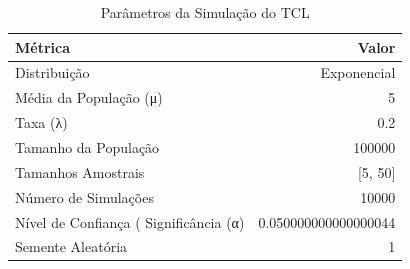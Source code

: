 \begin{table}[H]
\centering
\caption{Parâmetros da Simulação do TCL}
\label{tab:parametros_tcl}
\begin{tabular}{|l|r|}
\hline
\textbf{Métrica} & \textbf{Valor} \\
\hline
Distribuição & Exponencial \\
Média da População (μ) & 5 \\
Taxa (λ) & 0.2 \\
Tamanho da População & 100000 \\
Tamanhos Amostrais & [5, 50] \\
Número de Simulações & 10000 \\
Nível de Confiança (%
Significância (α) & 0.050000000000000044 \\
Semente Aleatória & 1 \\
\hline
\end{tabular}
\end{table}
